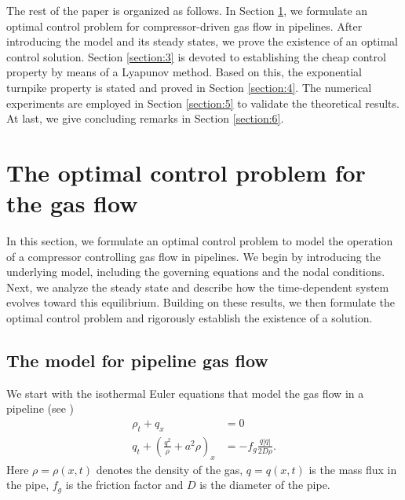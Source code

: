 \documentclass[12pt]{article}
\numberwithin{equation}{section}
\begin{document}

The rest of the paper is organized as follows. In Section \ref{section:2}, we formulate an optimal control problem for compressor-driven gas flow in pipelines. After introducing the model and its steady states, we prove the existence of an optimal control solution. Section \ref{section:3} is devoted to establishing the cheap control property by means of a Lyapunov method. Based on this, the exponential turnpike property is stated and proved in Section \ref{section:4}. The numerical experiments are employed in Section \ref{section:5} to validate the theoretical results. At last, we give concluding remarks in Section \ref{section:6}. 



\section{The optimal control problem for the gas flow}\label{section:2}

In this section, we formulate an optimal control problem to model the operation of a compressor controlling gas flow in pipelines. We begin by introducing the underlying model, including the governing equations and the nodal conditions. Next, we analyze the steady state and describe how the time-dependent system evolves toward this equilibrium. Building on these results, we then formulate the optimal control problem and rigorously establish the existence of a solution.


\subsection{The model for pipeline gas flow}

We start with the
isothermal Euler equations that model the gas flow 
in a pipeline 
(see \cite{banda2006coupling}) 
\begin{align}
\rho_t+q_x&=0 \label{gas-eq1}\\[1mm]
q_t+\left(\frac{q^2}{\rho}+a^2\rho\right)_x &= -f_g\frac{q|q|}{2D\rho}. \label{gas-eq2}
\end{align}
Here $\rho=\rho(x,t)$ denotes the density of the gas, $q=q(x,t)$ is the mass flux in the pipe, $f_g$ is the friction factor and $D$ is
the diameter of the pipe.
\end{document}
